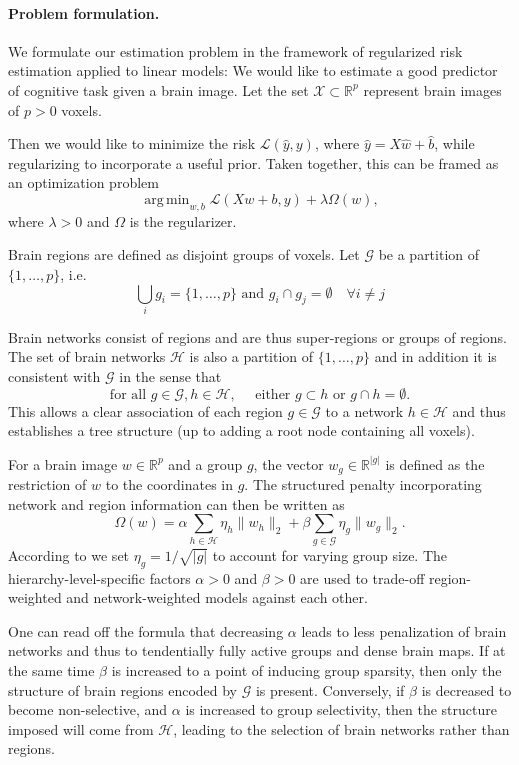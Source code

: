 \documentclass{article} %
\DeclareMathOperator*{\argmin}{arg\,min}
\newcommand{\R}{\mathbb{R}}
\begin{document}
\paragraph{Problem formulation.}
We formulate our estimation problem in the framework of regularized risk
estimation applied to linear models: 
We would like to estimate a good predictor of cognitive task
given a brain image. Let the set \(\mathcal X\subset\R^p\) represent brain
images of \(p > 0\) voxels.

Then we would like to minimize the risk \(\mathcal L(\hat y, y)\), where
\(\hat y = X\hat w + \hat b\), while regularizing to incorporate a useful
prior. Taken together, this can be framed as an optimization problem
\[\argmin_{w, b} \mathcal L(Xw + b, y) + \lambda\Omega(w),\]
where \(\lambda > 0\) and \(\Omega\) is the regularizer.

Brain regions are defined as disjoint groups of voxels. Let \(\mathcal G\)
be a partition of \(\{1, \dots, p\}\), i.e.
\[  \bigcup_{i} g_i = \{1, \dots, p\} \textrm{ and } g_i\cap g_j=\emptyset
\quad\forall i\not=j\]

Brain networks consist of regions and are thus super-regions or groups of 
regions. The set of brain networks \(\mathcal{H}\) is also a partition of 
\(\{1, \dots, p\}\) and in addition it is consistent with \(\mathcal G\) in
the sense that
\[\textrm{for all }g\in\mathcal G, h\in\mathcal H,\quad
\textrm{ either } g\subset h\textrm{ or }g\cap h = \emptyset.\]
This allows a clear association of each region \(g\in\mathcal G\) to a 
network \(h\in\mathcal H\) and thus establishes a tree structure (up to 
adding a root node containing all voxels).

For a brain image \(w\in\R^p\) and a group \(g\), the vector 
\(w_g\in\R^{|g|}\) is defined as the restriction of \(w\) to the coordinates
 in \(g\). The structured penalty incorporating network
and region information can then be written as
\[\Omega(w) = \alpha\sum_{h\in\mathcal H}\eta_h\|w_h\|_2 + \beta\sum_{g\in\mathcal G}\eta_g\|w_g\|_2.\]
According to \cite{Zhou_or_who_was_that} we set \(\eta_g = 1/\sqrt{|g|}\) to
account for varying group size. The hierarchy-level-specific factors 
\(\alpha > 0\) and \(\beta > 0\) are used to trade-off region-weighted and
network-weighted models against each other.

One can read off the formula that decreasing \(\alpha\) leads to less 
penalization of brain networks and thus to tendentially fully active groups
and dense brain maps. If at the same time \(\beta\) is increased to a point
of inducing group sparsity, then only the structure of brain regions encoded
by \(\mathcal G\) is present. Conversely, if \(\beta\) is decreased to 
become non-selective, and \(\alpha\) is increased to group selectivity,
then the structure imposed will come from \(\mathcal H\), leading to the
selection of brain networks rather than regions.
\end{document}

